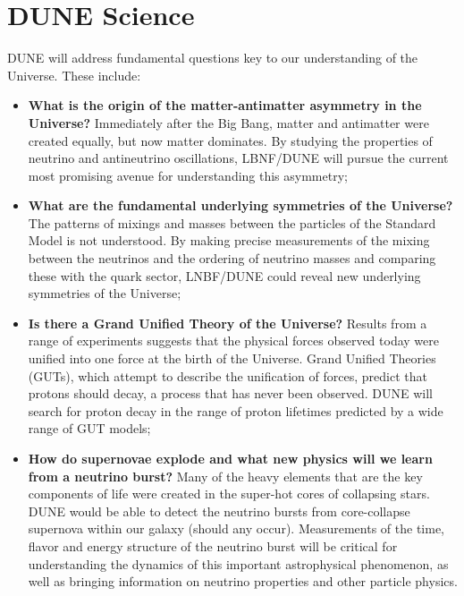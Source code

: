 
\chapter{DUNE Science}
\label{v1ch:science}


DUNE will address fundamental questions key to our understanding of the Universe. These include:
\begin{itemize}
   \item {\bf What is the origin of the matter-antimatter asymmetry in the Universe?} Immediately after
                    the Big Bang, matter and antimatter were created equally, but now matter dominates.
                    By studying the properties of neutrino and antineutrino oscillations, LBNF/DUNE 
                    will pursue the current most promising avenue for understanding this asymmetry;
   \item {\bf What are the fundamental underlying symmetries of the Universe?} The patterns of mixings and masses between the particles of the Standard Model is not understood. By making precise measurements of the mixing between the neutrinos and the ordering of neutrino masses and comparing these with the quark sector, LNBF/DUNE could reveal new underlying symmetries of the Universe;
  \item{\bf  Is there a Grand Unified Theory of the Universe?} Results from a range of experiments suggests that the
                 physical forces observed today were unified into one force at the birth of the Universe.
                Grand Unified Theories (GUTs), which attempt to describe the unification of forces,
                predict that protons should decay, a process that has never been observed. DUNE will 
                search for proton decay in the range of proton lifetimes predicted by a wide range of GUT models;
   \item{\bf How do supernovae explode and what new physics will we learn from a neutrino burst?}
   Many of the heavy elements that are the key components of life were created in the super-hot cores of collapsing stars. DUNE would be able to detect the neutrino bursts from core-collapse supernova within our galaxy (should any occur). Measurements of the time, flavor and energy structure of the neutrino burst will be critical for understanding the dynamics of this important astrophysical phenomenon, as well as bringing information on neutrino properties and other particle physics.
\end{itemize}


